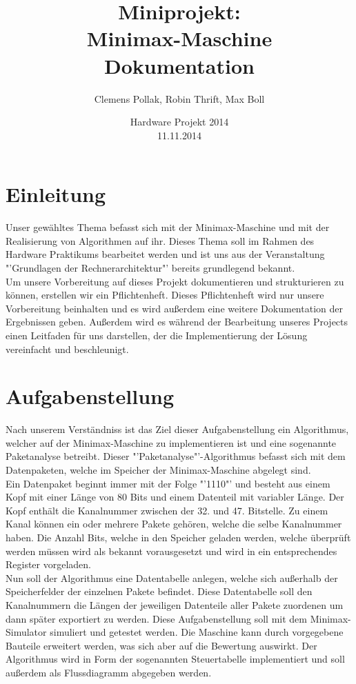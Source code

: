 \documentclass[12pt,titlepage]{article}
\begin{document}
\title{Miniprojekt: \\ Minimax-Maschine \\ Dokumentation}
\author{Clemens Pollak, Robin Thrift, Max Boll}
\date{Hardware Projekt 2014 \\ 11.11.2014}
\maketitle

\tableofcontents

\newpage

\section{Einleitung} 
Unser gew{\"a}hltes Thema befasst sich mit der Minimax-Maschine und mit der Realisierung von Algorithmen auf ihr. Dieses Thema soll im Rahmen des Hardware Praktikums bearbeitet werden und ist uns aus der Veranstaltung "'Grundlagen der Rechnerarchitektur"' bereits grundlegend bekannt.\\ Um unsere Vorbereitung auf dieses Projekt dokumentieren und strukturieren zu k{\"o}nnen, erstellen wir ein Pflichtenheft. Dieses Pflichtenheft wird nur unsere Vorbereitung beinhalten und es wird au{\ss}erdem eine weitere Dokumentation der Ergebnissen geben. Außerdem wird es w{\"a}hrend der Bearbeitung unseres Projects einen Leitfaden für uns darstellen, der die Implementierung der L{\"o}sung vereinfacht und beschleunigt.


\section{Aufgabenstellung}
Nach unserem Verst{\"a}ndniss ist das Ziel dieser Aufgabenstellung ein Algorithmus, welcher auf der Minimax-Maschine zu implementieren ist und eine sogenannte Paketanalyse betreibt. Dieser "'Paketanalyse"'-Algorithmus befasst sich mit dem Datenpaketen, welche im Speicher der Minimax-Maschine abgelegt sind.\\ Ein Datenpaket beginnt immer mit der Folge "'1110"' und besteht aus einem
Kopf mit einer L{\"a}nge von 80 Bits und einem Datenteil mit variabler L{\"a}nge. Der Kopf enth{\"a}lt die Kanalnummer zwischen der 32. und 47. Bitstelle. Zu einem Kanal k{\"o}nnen ein oder mehrere Pakete geh{\"o}ren, welche die selbe Kanalnummer haben.
Die Anzahl Bits, welche in den Speicher geladen werden, welche überprüft werden müssen wird als bekannt vorausgesetzt und wird in ein entsprechendes Register vorgeladen.\\
Nun soll der Algorithmus eine Datentabelle anlegen, welche sich au{\ss}erhalb der Speicherfelder der einzelnen Pakete befindet. Diese Datentabelle soll den Kanalnummern die L{\"a}ngen der jeweiligen Datenteile aller Pakete zuordenen um dann später exportiert zu werden. Diese Aufgabenstellung soll mit dem Minimax-Simulator simuliert und getestet werden. Die Maschine kann durch vorgegebene Bauteile erweitert werden, was sich aber auf die Bewertung auswirkt. Der Algorithmus wird in Form der sogenannten Steuertabelle implementiert und soll außerdem als Flussdiagramm abgegeben werden.
\end{document}
